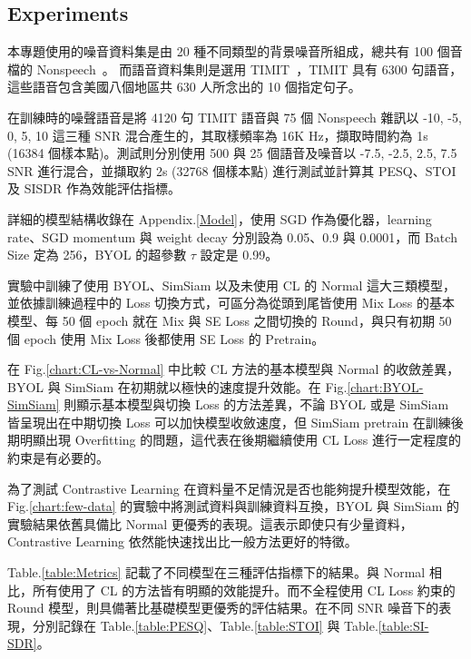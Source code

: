 \documentclass[10pt,twocolumn,letterpaper]{article}
\begin{document}
\begin{CJK}{UTF8}{bkai}
   \section{Experiments}
   本專題使用的噪音資料集是由 20 種不同類型的背景噪音所組成，總共有 100 個音檔的 Nonspeech~\cite{Nonspeech}。
   而語音資料集則是選用 TIMIT~\cite{TIMIT}，TIMIT 具有 6300 句語音，這些語音包含美國八個地區共 630 人所念出的 10
   個指定句子。

   在訓練時的噪聲語音是將 4120 句 TIMIT 語音與 75 個 Nonspeech 雜訊以 -10, -5, 0, 5, 10 這三種 SNR
   混合產生的，其取樣頻率為 16K Hz，擷取時間約為 1s (16384 個樣本點)。測試則分別使用 500 與 25 個語音及噪音以 -7.5,
   -2.5, 2.5, 7.5 SNR 進行混合，並擷取約 2s (32768 個樣本點) 進行測試並計算其 PESQ\cite{PESQ}、STOI\cite{STOI} 及 SISDR\cite{SISDR}
   作為效能評估指標。

   詳細的模型結構收錄在 Appendix.\ref{Model}，使用 SGD 作為優化器，learning rate、SGD momentum 與 weight decay 分別設為 0.05、0.9 與
   0.0001，而 Batch Size 定為 256，BYOL 的超參數 $\tau$ 設定是 0.99。

   實驗中訓練了使用 BYOL、SimSiam 以及未使用 CL 的 Normal 這大三類模型，並依據訓練過程中的 Loss
   切換方式，可區分為從頭到尾皆使用 Mix Loss 的基本模型、每 50 個 epoch 就在 Mix 與 SE Loss 之間切換的
   Round，與只有初期 50 個 epoch 使用 Mix Loss 後都使用 SE Loss 的 Pretrain。

   在 Fig.\ref{chart:CL-vs-Normal} 中比較 CL 方法的基本模型與 Normal 的收斂差異，BYOL 與 SimSiam
   在初期就以極快的速度提升效能。在 Fig.\ref{chart:BYOL-SimSiam} 則顯示基本模型與切換 Loss 的方法差異，不論
   BYOL 或是 SimSiam 皆呈現出在中期切換 Loss 可以加快模型收斂速度，但 SimSiam pretrain 在訓練後期明顯出現
   Overfitting 的問題，這代表在後期繼續使用 CL Loss 進行一定程度的約束是有必要的。

   為了測試 Contrastive Learning 在資料量不足情況是否也能夠提升模型效能，在 Fig.\ref{chart:few-data}
   的實驗中將測試資料與訓練資料互換，BYOL 與 SimSiam 的實驗結果依舊具備比 Normal 更優秀的表現。這表示即使只有少量資料，Contrastive
   Learning 依然能快速找出比一般方法更好的特徵。

   Table.\ref{table:Metrics} 記載了不同模型在三種評估指標下的結果。與 Normal 相比，所有使用了 CL
   的方法皆有明顯的效能提升。而不全程使用 CL Loss 約束的 Round 模型，則具備著比基礎模型更優秀的評估結果。在不同 SNR
   噪音下的表現，分別記錄在 Table.\ref{table:PESQ}、Table.\ref{table:STOI} 與 Table.\ref{table:SI-SDR}。


\end{CJK}
\end{document}
